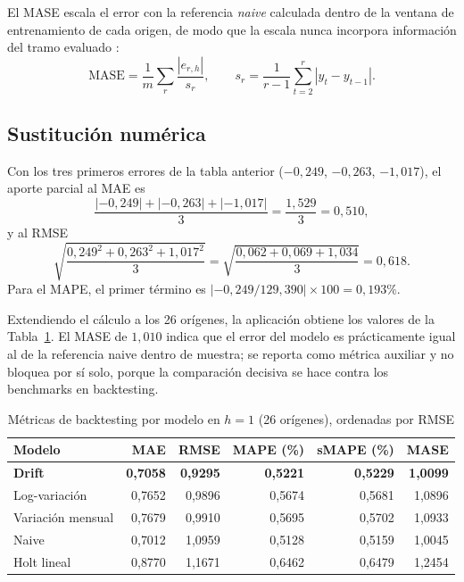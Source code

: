 \documentclass[11pt,letterpaper]{article}
\begin{document}
El MASE escala el error con la referencia \emph{naive} calculada dentro de la
ventana de entrenamiento de cada origen, de modo que la escala nunca incorpora
información del tramo evaluado \cite{hyndman_koehler2006}:
\begin{equation}
\mathrm{MASE}=\frac{1}{m}\sum_{r}\frac{|e_{r,h}|}{s_r},
\qquad
s_r=\frac{1}{r-1}\sum_{t=2}^{r}|y_t-y_{t-1}| .
\end{equation}

\subsection{Sustitución numérica}

Con los tres primeros errores de la tabla anterior
(\(-0{,}249\), \(-0{,}263\), \(-1{,}017\)), el aporte parcial al MAE es
\begin{equation}
\frac{|-0{,}249|+|-0{,}263|+|-1{,}017|}{3}=\frac{1{,}529}{3}=0{,}510 ,
\end{equation}
y al RMSE
\begin{equation}
\sqrt{\frac{0{,}249^{2}+0{,}263^{2}+1{,}017^{2}}{3}}
=\sqrt{\frac{0{,}062+0{,}069+1{,}034}{3}}=0{,}618 .
\end{equation}
Para el MAPE, el primer término es
\(|-0{,}249/129{,}390|\times100=0{,}193\%\).

Extendiendo el cálculo a los 26 orígenes, la aplicación obtiene los valores de
la Tabla~\ref{tab:metricas}. El MASE de \(1{,}010\) indica que el error del
modelo es prácticamente igual al de la referencia naive dentro de muestra; se
reporta como métrica auxiliar y no bloquea por sí solo, porque la comparación
decisiva se hace contra los benchmarks en backtesting.

\begin{table}[H]
\centering
\caption{Métricas de backtesting por modelo en \(h=1\) (26 orígenes), ordenadas por RMSE}
\label{tab:metricas}
\begin{tabular}{@{}lrrrrr@{}}
\toprule
\textbf{Modelo} & \textbf{MAE} & \textbf{RMSE} & \textbf{MAPE (\%)} & \textbf{sMAPE (\%)} & \textbf{MASE} \\
\midrule
\textbf{Drift} & \textbf{0{,}7058} & \textbf{0{,}9295} & \textbf{0{,}5221} & \textbf{0{,}5229} & \textbf{1{,}0099} \\
Log-variación & 0{,}7652 & 0{,}9896 & 0{,}5674 & 0{,}5681 & 1{,}0896 \\
Variación mensual & 0{,}7679 & 0{,}9910 & 0{,}5695 & 0{,}5702 & 1{,}0933 \\
Naive & 0{,}7012 & 1{,}0959 & 0{,}5128 & 0{,}5159 & 1{,}0045 \\
Holt lineal & 0{,}8770 & 1{,}1671 & 0{,}6462 & 0{,}6479 & 1{,}2454 \\
\bottomrule
\end{tabular}
\end{table}
\end{document}
